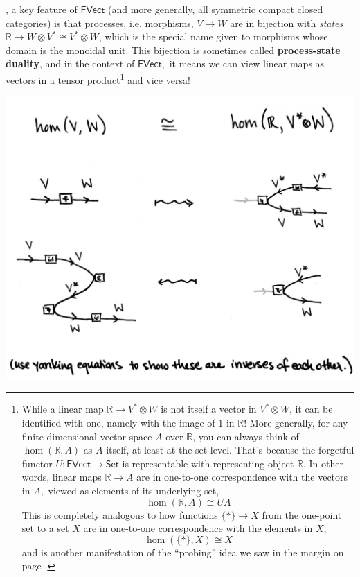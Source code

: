 \documentclass{tufte-handout-tai}
\theoremstyle{plain}
\theoremstyle{definition}
\theoremstyle{remark}
\begin{document}
, a key feature of $\mathsf{FVect}$ (and more generally, all symmetric compact closed categories) is that processes, i.e. morphisms, $V\to W$ are in bijection with \textit{states} $\mathbb{R}\to W\otimes V^*\cong V^*\otimes W$, which is the special name given to morphisms whose domain is the monoidal unit. This bijection is sometimes called \textbf{process-state duality}, and in the context of $\mathsf{FVect},$ it means we can view linear maps as vectors in a tensor product\footnote{While a linear map $\mathbb{R}\to V^*\otimes W$ is not itself a vector in $V^*\otimes W$, it can be identified with one, namely with the image of 1 in $\mathbb{R}$! More generally, for any finite-dimensional vector space $A$ over $\mathbb{R}$, you can always think of $\hom(\mathbb{R},A)$ as $A$ itself, at least at the set level. That's because the forgetful functor $U\colon \mathsf{FVect}\to \mathsf{Set}$ is representable with representing object $\mathbb{R}$. In other words, linear maps $\mathbb{R}\to A$ are in one-to-one correspondence with the vectors in $A,$ viewed as elements of its underlying set, \[\hom(\mathbb{R},A)\cong UA\] This is completely analogous to how functions $\{\ast\}\to X$ from the one-point set to a set $X$ are in one-to-one correspondence with the elements in $X,$ \[\hom(\{\ast\},X)\cong X\] and is another manifestation of the ``probing'' idea we saw in the margin on page \pageref{fig:probe}.} and vice versa! 
\begin{center}
\includegraphics[width=!,totalheight=!,scale=0.11]{ps1.jpg}
\end{center}
\end{document}

